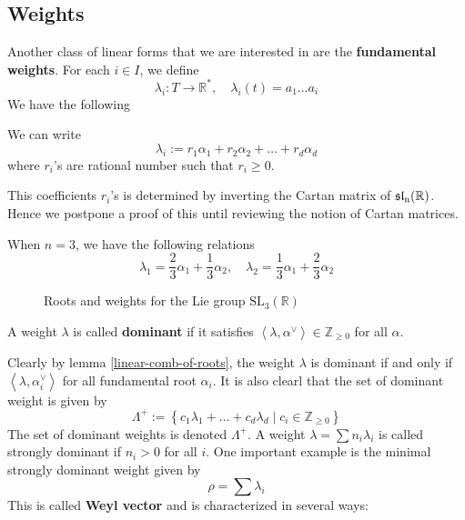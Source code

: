 \subsection{Weights}
Another class of linear forms that we are interested in are the \textbf{fundamental weights}. For each $i \in I$, we define
\[\lambda_i \colon T \to \mathbb{R}^*, \quad\lambda_i(t) = a_1\ldots a_i\]
We have the following
\begin{lemma}\label{linear-comb-of-weights}
    We can write
    \[\lambda_i := r_1\alpha_1 + r_2\alpha_2+\ldots + r_d\alpha_d\]
    where $r_i$'s are rational number such that $r_i \ge 0$.
\end{lemma}
This coefficients $r_i$'s is determined by inverting the Cartan matrix of $\operatorname{\mathfrak{sl}_n(\mathbb{R})}$. Hence we postpone a proof
of this until reviewing the notion of Cartan matrices.
\begin{example}
    When $n=3$, we have the following relations
    \[\lambda_1 = \dfrac{2}{3}\alpha_1+\dfrac{1}{3}\alpha_2, \quad \lambda_2 = \dfrac{1}{3}\alpha_1+\dfrac{2}{3}\alpha_2\]
\end{example}
\begin{figure}[h]
    \centering
    \caption{Roots and weights for the Lie group $\text{SL}_3(\mathbb{R})$}
\end{figure}


\begin{definition}
    A weight $\lambda$ is called \textbf{dominant} if it satisfies $\left\langle \lambda,\alpha^{\vee} \right\rangle \in \mathbb{Z}_{\ge 0}$ for all $\alpha$.
\end{definition}
Clearly by lemma \ref{linear-comb-of-roots}, the weight $\lambda$ is dominant if and only if $\left\langle\lambda,\alpha_i^\vee\right\rangle$ for all
fundamental root $\alpha_i$. It is also clearl that the set of dominant weight is given by
\[\Lambda^+ := \left\lbrace c_1\lambda_1+\ldots+c_d\lambda_d \mid c_i \in \mathbb{Z}_{\ge 0}\right\rbrace\]
The set of dominant weights is denoted $\Lambda^+$. A weight $\lambda = \sum n_i \lambda_i$ is called strongly dominant if $n_i > 0$ for all $i$. One important example is the minimal strongly dominant weight given by
\[
    \rho = \sum \lambda_i
\]
This is called \textbf{Weyl vector} and is characterized in several ways:

